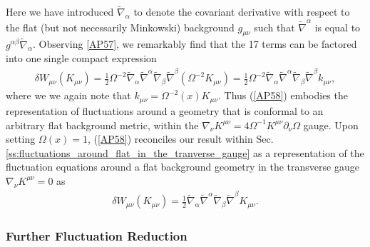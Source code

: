 %
Here we have introduced $\tilde{\nabla}_{\alpha}$ to denote the covariant derivative with respect to the flat (but not necessarily Minkowski) background $g_{\mu\nu}$ such that $\tilde{\nabla}^{\alpha}$ is equal to $g^{\alpha\beta}\tilde{\nabla}_{\alpha}$. Observing \eqref{AP57}, we remarkably find that the 17 terms can be factored into one single compact expression
%
\begin{eqnarray}
\delta W_{\mu\nu}(K_{\mu\nu})=\frac{1}{2}\Omega^{-2}\tilde{\nabla}_{\alpha}\tilde{\nabla}^{\alpha}\tilde{\nabla}_{\beta}\tilde{\nabla}^{\beta}(\Omega^{-2}K_{\mu\nu})
=\frac{1}{2}\Omega^{-2}\tilde{\nabla}_{\alpha}\tilde{\nabla}^{\alpha}\tilde{\nabla}_{\beta}\tilde{\nabla}^{\beta}k_{\mu\nu},
\label{AP58}
\end{eqnarray}
%
where we we again note that $k_{\mu\nu}=\Omega^{-2}(x)K_{\mu\nu}$. Thus (\ref{AP58}) embodies the representation of fluctuations around a geometry that is conformal to an arbitrary flat background metric, within the  $\nabla_{\nu}K^{\mu\nu}=4\Omega^{-1}K^{\mu\nu}\partial_{\nu}\Omega$ gauge. Upon setting $\Omega(x)=1$,  (\ref{AP58}) reconciles our result within Sec. \ref{ss:fluctuations_around_flat_in_the_tranverse_gauge} as a representation of the fluctuation equations around a flat background geometry in the transverse gauge $\nabla_{\nu}K^{\mu\nu}=0$ as 
%
\begin{eqnarray}
\delta W_{\mu\nu}(K_{\mu\nu})=\frac{1}{2}\tilde{\nabla}_{\alpha}\tilde{\nabla}^{\alpha}\tilde{\nabla}_{\beta}\tilde{\nabla}^{\beta}K_{\mu\nu}.
\label{AP59}
\end{eqnarray}
%

\subsubsection{Further Fluctuation Reduction}
\label{sss:obtaining_fluctuation_eqns_in_cgauge}

